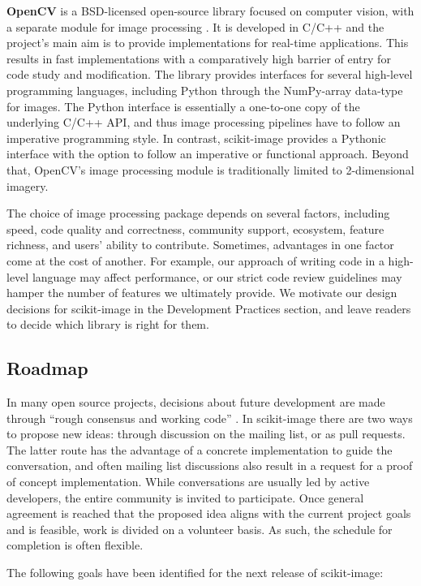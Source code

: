 \documentclass[fleqn,12pt]{wlpeerj}
\begin{document}
\textbf{OpenCV} is a BSD-licensed open-source library focused on computer vision, with
a separate module for image processing \citep{opencv}. It is
developed in C/C++ and the project's main aim is to provide implementations for
real-time applications. This results in fast implementations with a comparatively high
barrier of entry for code study and modification. The library provides
interfaces for several high-level programming languages, including Python
through the NumPy-array data-type for images. The Python interface is
essentially a one-to-one copy of the underlying C/C++ API, and thus image
processing pipelines have to follow an imperative programming style. In
contrast, scikit-image provides a Pythonic interface with the option
to follow an imperative or functional approach. Beyond that, OpenCV's image
processing module is traditionally limited to 2-dimensional imagery.

The choice of image processing package depends on several factors, including
speed, code quality and correctness, community support, ecosystem, feature
richness, and users' ability to contribute. Sometimes, advantages in one
factor come at the cost of another. For example, our approach of writing code
in a high-level language may affect performance, or our strict code review
guidelines may hamper the number of features we ultimately provide. We
motivate our design decisions for scikit-image in the Development Practices
section, and leave readers to decide which library is right for them.

\subsection*{Roadmap}

In many open source projects, decisions about future development are made
through ``rough consensus and working code'' \citep{rfc2418}.  In scikit-image
there are two ways to propose new ideas: through discussion on the mailing
list, or as pull requests.  The latter route has the advantage of a concrete
implementation to guide the conversation, and often mailing list discussions
also result in a request for a proof of concept implementation.  While
conversations are usually led by active developers, the entire community is
invited to participate.  Once general agreement is reached that the proposed
idea aligns with the current project goals and is feasible, work is divided
on a volunteer basis.  As such, the schedule for completion is often
flexible.

The following goals have been identified for the next release of scikit-image:
\end{document}
